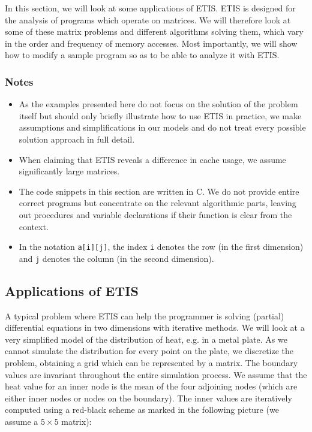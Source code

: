 In this section, we will look at some applications of ETIS. ETIS is designed for the analysis of programs which operate on matrices. We will therefore look at some of these matrix problems and different algorithms solving them, which vary in the order and frequency of memory accesses. Most importantly, we will show how to modify a sample program so as to be able to analyze it with ETIS.

\subsubsection*{Notes}
\begin{itemize}
\item As the examples presented here do not focus on the solution of the problem itself but should only briefly illustrate how to use ETIS in practice, we make assumptions and simplifications in our models and do not treat every possible solution approach in full detail.

\item When claiming that ETIS reveals a difference in cache usage, we assume significantly large matrices.

\item The code snippets in this section are written in C. We do not provide entire correct programs but concentrate on the relevant algorithmic parts, leaving out procedures and variable declarations if their function is clear from the context.

\item In the notation \texttt{a[i][j]}, the index \texttt{i} denotes the row (in the first dimension) and \texttt{j} denotes the column (in the second dimension).
\end{itemize}


\subsection{Applications of ETIS}

A typical problem where ETIS can help the programmer is solving (partial) differential equations in two dimensions with iterative methods. We will look at a very simplified model of the distribution of heat, e.g. in a metal plate.
As we cannot simulate the distribution for every point on the plate, we discretize the problem, obtaining a grid which can be represented by a matrix. The boundary values are invariant throughout the entire simulation process. We assume that the heat value for an inner node is the mean of the four adjoining nodes (which are either inner nodes or nodes on the boundary). The inner values are iteratively computed using a red-black scheme as marked in the following picture (we assume a $5 \times 5$ matrix):

